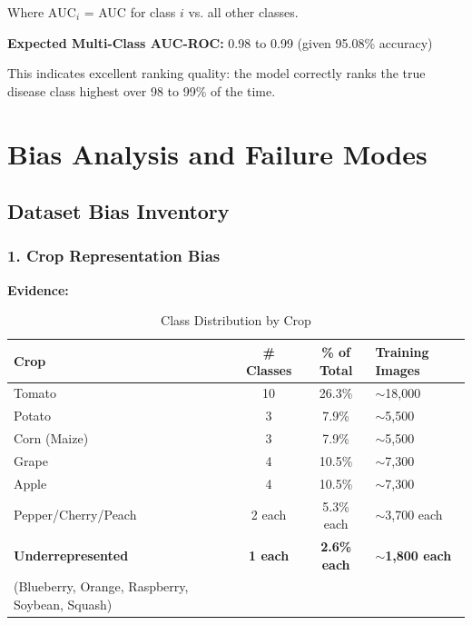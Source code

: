 \documentclass[11pt,a4paper]{article}
\begin{document}
Where $\text{AUC}_i$ = AUC for class $i$ vs. all other classes.

\textbf{Expected Multi-Class AUC-ROC:} 0.98 to 0.99 (given 95.08\% accuracy)

This indicates excellent ranking quality: the model correctly ranks the true disease class highest over 98 to 99\% of the time.

\newpage

\section{Bias Analysis and Failure Modes}

\subsection{Dataset Bias Inventory}

\subsubsection{1. Crop Representation Bias}

\textbf{Evidence:}

\begin{table}[H]
\centering
\caption{Class Distribution by Crop}
\label{tab:crop_dist}
\begin{tabularx}{\textwidth}{l c c >{\raggedright\arraybackslash}X}
\toprule
\rowcolor{primarynavy}
\color{white}\textbf{Crop} & \color{white}\textbf{\# Classes} & \color{white}\textbf{\% of Total} & \color{white}\textbf{Training Images} \\
\midrule
Tomato & 10 & 26.3\% & $\sim$18,000 \\
\rowcolor{iceblue}
Potato & 3 & 7.9\% & $\sim$5,500 \\
Corn (Maize) & 3 & 7.9\% & $\sim$5,500 \\
\rowcolor{iceblue}
Grape & 4 & 10.5\% & $\sim$7,300 \\
Apple & 4 & 10.5\% & $\sim$7,300 \\
\rowcolor{iceblue}
Pepper/Cherry/Peach & 2 each & 5.3\% each & $\sim$3,700 each \\
\textbf{Underrepresented} & \textbf{1 each} & \textbf{2.6\% each} & \textbf{$\sim$1,800 each} \\
(Blueberry, Orange, Raspberry, Soybean, Squash) & & & \\
\bottomrule
\end{tabularx}
\end{table}
\end{document}
